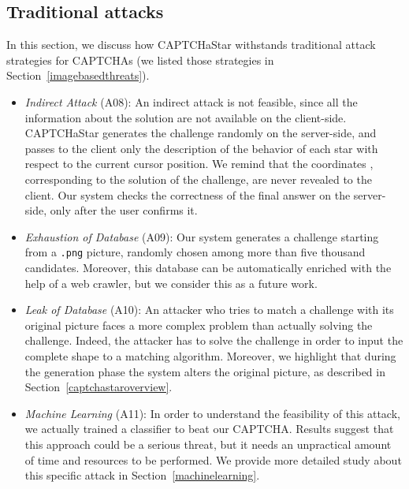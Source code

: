 \documentclass[conference]{IEEEtran}
\begin{document}
\subsection{Traditional attacks}
\label{evaluatesecurity}
In this section, we discuss how CAPTCHaStar withstands traditional attack strategies for CAPTCHAs (we listed those strategies in Section~\ref{imagebasedthreats}).
\begin{itemize}
\item\textit{Indirect Attack} (A08): An indirect attack is not feasible, since all the information about the solution are not available on the client-side. 
CAPTCHaStar generates the challenge randomly on the server-side, and passes to the client only the description of the behavior of each star with respect to the current cursor position.
We remind that the coordinates , corresponding to the solution of the challenge, are never revealed to the client.
Our system checks the correctness of the final answer on the server-side, only after the user confirms it. 

\item\textit{Exhaustion of Database} (A09): Our system generates a challenge starting from a \texttt{.png} picture, randomly chosen among more than five thousand candidates.
Moreover, this database can be automatically enriched with the help of a web crawler, but we consider this as a future work.

\item\textit{Leak of Database} (A10): An attacker who tries to match a challenge with its original picture faces a more complex problem than actually solving the challenge. 
Indeed, 
the attacker has to solve the challenge in order to input the complete shape to a matching algorithm.
Moreover, we highlight that during the generation phase the system alters the original picture, as described in Section~\ref{captchastaroverview}.


\item\textit{Machine Learning} (A11): In order to understand the feasibility of this attack, we actually trained a classifier to beat our CAPTCHA. Results suggest that this approach could be a serious threat, but it needs an unpractical amount of time and resources to be performed. We provide more detailed study about this specific attack in Section~\ref{machinelearning}.


\end{itemize}
\end{document}
